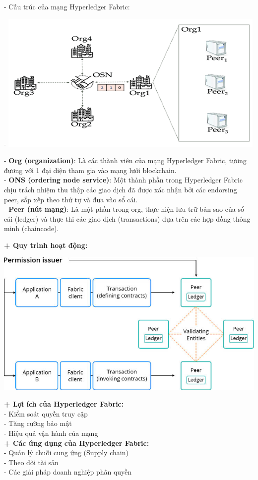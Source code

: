 \documentclass[a4paper,12pt]{article}
\begin{document}
- Cấu trúc của mạng Hyperledger Fabric:
\begin{center}
- \includegraphics[scale=1.3]{Anh/A4.png}
\end{center}
\begin{itemize}
- \textbf{Org (organization)}: Là các thành viên của mạng Hyperledger Fabric, tương đương với 1 đại diện tham gia vào mạng lưới blockchain.\\
- \textbf{ONS (ordering node service)}: Một thành phần trong Hyperledger Fabric chịu trách nhiệm thu thập các giao dịch đã được xác nhận bởi các endorsing peer, sắp xếp theo thứ tự và đưa vào sổ cái.\\
- \textbf{Peer (nút mạng)}: Là một phần trong org, thực hiện lưu trữ bản sao của sổ cái (ledger) và thực thi các giao dịch (transactions) dựa trên các hợp đồng thông minh (chaincode).\\
\end{itemize}\vspace{5cm}
\textbf{+ Quy trình hoạt động:}
\begin{center}
\includegraphics[scale=0.7]{Anh/A5.png}
\end{center}
\textbf{+ Lợi ích của Hyperledger Fabric:\\}
- Kiểm soát quyền truy cập\\
- Tăng cường bảo mật\\
- Hiệu quả vận hành của mạng\\
\textbf{+ Các ứng dụng của Hyperledger Fabric:\\}
- Quản lý chuỗi cung ứng (Supply chain)\\
- Theo dõi tài sản\\
- Các giải pháp doanh nghiệp phân quyền\\
\end{document}
